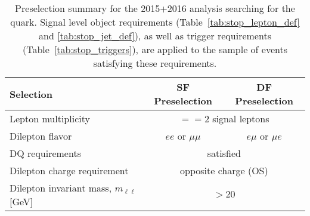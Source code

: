 \begin{table}[!htb]
    \begin{center}
        \caption{
            Preselection summary for the 2015+2016 analysis searching for the \stopone quark.
            Signal level object requirements (Table~\ref{tab:stop_lepton_def} and \ref{tab:stop_jet_def}), as well as trigger requirements
            (Table~\ref{tab:stop_triggers}), are applied
            to the sample of events satisfying these requirements.
        }
        \label{tab:stop_preselection}
        \begin{tabular}{l|c| c}
            \hline
            \hline
            \textbf{Selection} & \textbf{SF Preselection} & \textbf{DF Preselection} \\
            \hline
            Lepton multiplicity & \multicolumn{2}{c}{$==2$ signal leptons} \\
            Dilepton flavor & $ee$ or $\mu \mu$ & $e\mu$ or $\mu e$ \\
            DQ requirements & \multicolumn{2}{c}{satisfied} \\
            Dilepton charge requirement & \multicolumn{2}{c}{opposite charge (OS)} \\
            Dilepton invariant mass, $m_{\ell\ell}$ [GeV] & \multicolumn{2}{c}{$>20$} \\
            \hline
            \hline
        \end{tabular}
    \end{center}
\end{table}

